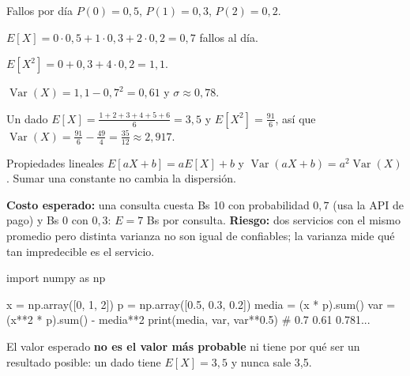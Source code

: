 \begin{tmejemplo}{Fallos por d\'ia}
$P(0)=0{,}5$, $P(1)=0{,}3$, $P(2)=0{,}2$.
\begin{tmpasos}
\item $E[X]=0\cdot0{,}5+1\cdot0{,}3+2\cdot0{,}2=0{,}7$ fallos al d\'ia.
\item $E[X^2]=0+0{,}3+4\cdot0{,}2=1{,}1$.
\item $\operatorname{Var}(X)=1{,}1-0{,}7^2=0{,}61$ y $\sigma\approx0{,}78$.
\end{tmpasos}
\end{tmejemplo}

\begin{tmejemplo}{Un dado}
$E[X]=\frac{1+2+3+4+5+6}6=3{,}5$ y $E[X^2]=\frac{91}6$, as\'i que $\operatorname{Var}(X)=\frac{91}6-\frac{49}4=\frac{35}{12}\approx2{,}917$.
\end{tmejemplo}

\begin{tmdef}{Propiedades lineales}
$E[aX+b]=aE[X]+b$ y $\operatorname{Var}(aX+b)=a^2\operatorname{Var}(X)$. Sumar una constante no cambia la dispersi\'on.
\end{tmdef}

\begin{tmsistemas}
\textbf{Costo esperado:} una consulta cuesta Bs 10 con probabilidad $0{,}7$ (usa la API de pago) y Bs 0 con $0{,}3$: $E=7$ Bs por consulta. \textbf{Riesgo:} dos servicios con el mismo promedio pero distinta varianza no son igual de confiables; la varianza mide qu\'e tan impredecible es el servicio.
\end{tmsistemas}

\begin{tmcodigo}
import numpy as np

x = np.array([0, 1, 2])
p = np.array([0.5, 0.3, 0.2])
media = (x * p).sum()
var = (x**2 * p).sum() - media**2
print(media, var, var**0.5)      # 0.7  0.61  0.781...
\end{tmcodigo}

\begin{tmcuidado}El valor esperado \textbf{no es el valor m\'as probable} ni tiene por qu\'e ser un resultado posible: un dado tiene $E[X]=3{,}5$ y nunca sale 3,5.\end{tmcuidado}


